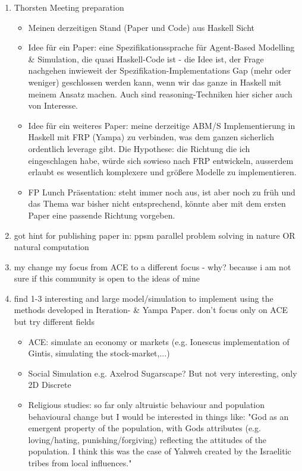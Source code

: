 \begin{enumerate}
\item Thorsten Meeting preparation
\begin{itemize}
	\item Meinen derzeitigen Stand (Paper und Code) aus Haskell Sicht
	\item Idee für ein Paper: eine Spezifikationssprache für Agent-Based Modelling \& Simulation, die quasi Haskell-Code ist - die Idee ist, der Frage nachgehen inwieweit der Spezifikation-Implementations Gap (mehr oder weniger) geschlossen werden kann, wenn wir das ganze in Haskell mit meinem Ansatz machen. Auch sind reasoning-Techniken hier sicher auch von Interesse.
	\item Idee für ein weiteres Paper: meine derzeitige ABM/S Implementierung in Haskell mit FRP (Yampa) zu verbinden, was dem ganzen sicherlich ordentlich leverage gibt. Die Hypothese: die Richtung die ich eingeschlagen habe, würde sich sowieso nach FRP entwickeln, ausserdem erlaubt es wesentlich komplexere und größere Modelle zu implementieren.
	\item FP Lunch Präsentation: steht immer noch aus, ist aber noch zu früh und das Thema war bisher nicht entsprechend, könnte aber mit dem ersten Paper eine passende Richtung vorgeben.
\end{itemize}

\item got hint for publishing paper in: ppsm parallel problem solving in nature OR natural computation
	
\item my change my focus from ACE to a different focus - why? because i am not sure if this community is open to the ideas of mine
\item find 1-3 interesting and large model/simulation to implement using the methods developed in Iteration- \& Yampa Paper. don't focus only on ACE but try different fields
	\begin{itemize}
		\item ACE: simulate an economy or markets (e.g. Ionescus implementation of Gintis, simulating the stock-market,...)
		\item Social Simulation e.g. Axelrod Sugarscape? But not very interesting, only 2D Discrete 
		\item Religious studies: so far only altruistic behaviour and population behavioural change but I would be interested in things like: "God as an emergent property of the population, with Gods attributes (e.g. loving/hating, punishing/forgiving) reflecting the attitudes of the population. I think this was the case of Yahweh created by the Israelitic tribes from local influences."
	\end{itemize}

\end{enumerate} 

